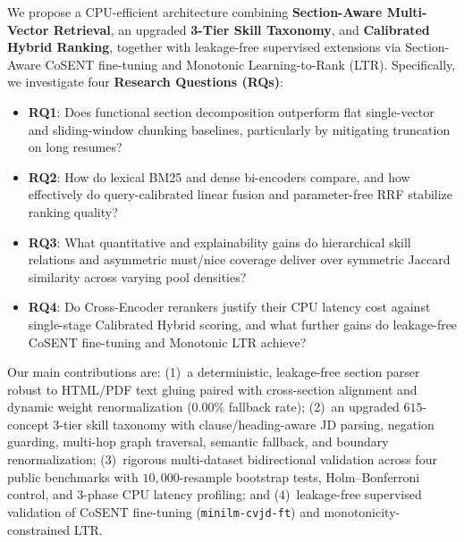 We propose a CPU-efficient architecture combining \textbf{Section-Aware Multi-Vector Retrieval}, an upgraded \textbf{3-Tier Skill Taxonomy}, and \textbf{Calibrated Hybrid Ranking}, together with leakage-free supervised extensions via Section-Aware CoSENT fine-tuning and Monotonic Learning-to-Rank (LTR). Specifically, we investigate four \textbf{Research Questions (RQs)}:
\begin{itemize}
    \item \textbf{RQ1}: Does functional section decomposition outperform flat single-vector and sliding-window chunking baselines, particularly by mitigating truncation on long resumes?
    \item \textbf{RQ2}: How do lexical BM25 and dense bi-encoders compare, and how effectively do query-calibrated linear fusion and parameter-free RRF stabilize ranking quality?
    \item \textbf{RQ3}: What quantitative and explainability gains do hierarchical skill relations and asymmetric must/nice coverage deliver over symmetric Jaccard similarity across varying pool densities?
    \item \textbf{RQ4}: Do Cross-Encoder rerankers justify their CPU latency cost against single-stage Calibrated Hybrid scoring, and what further gains do leakage-free CoSENT fine-tuning and Monotonic LTR achieve?
\end{itemize}

Our main contributions are: (1)~a deterministic, leakage-free section parser robust to HTML/PDF text gluing paired with cross-section alignment and dynamic weight renormalization ($0.00\%$ fallback rate); (2)~an upgraded $615$-concept 3-tier skill taxonomy with clause/heading-aware JD parsing, negation guarding, multi-hop graph traversal, semantic fallback, and boundary renormalization; (3)~rigorous multi-dataset bidirectional validation across four public benchmarks with $10{,}000$-resample bootstrap tests, Holm--Bonferroni control, and 3-phase CPU latency profiling; and (4)~leakage-free supervised validation of CoSENT fine-tuning (\texttt{minilm-cvjd-ft}) and monotonicity-constrained LTR.
